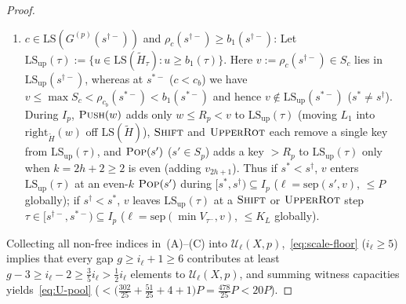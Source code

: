 \documentclass[11pt]{article}
\theoremstyle{definition}
\theoremstyle{remark}
\newcommand{\LS}{\mathrm{LS}}
\newcommand{\sep}{\mathrm{sep}}
\newcommand{\PUSH}{\textnormal{\scshape Push}}
\newcommand{\POP}{\textnormal{\scshape Pop}}
\newcommand{\SHIFT}{\textnormal{\scshape Shift}}
\newcommand{\UPROT}{\textnormal{\scshape UpperRot}}
\begin{document}
\begin{proof}
\begin{enumerate}[label=(\Alph*)]
\begin{itemize}[leftmargin=1.5em]
    \item \emph{Subcase B2 ($i_q = 2j$ even, with $q \ge 2$ or $v_{2j-1} > \rho_{c_a}(s^{\dagger -})$):} Here $v_{2j-1}$ lies above $\rho_{c_a}(s^{\dagger -})$ (hence $> \max S_{c_a}$), so $S_d := B_\ell(v_{2j-1})$ satisfies $c_a < d \le c_{\eta_q} < c_b$ ($d \notin \mathcal{F}_p$), while $v_{2j+1} > \max S_{c_{\eta_q}}$. If $d < c_{\eta_q}$, then $e_j = (v_{2j-1}, v_{2j}, v_{2j+1}) \in V_{X, p}$ would force $d \in \mathcal{F}_p$; hence $d = c_{\eta_q}$ ($v_{2j-1}, v_{2j} \in S_{c_{\eta_q}}$), pinning $\ell = \sep(s^\dagger, v_{2j-1}) < \sep(v_{2j-1}, v_{2j})$ and placing $e_j \in \mathcal{S}_1 \sqcup \mathcal{B}_{\mathrm{leaf,pre}}$ as in Lemma~\ref{lem:b3-escape}(d) (disjoint from $\mathcal{B}_{3,\mathrm{intra}}$, so each element of $\mathcal{B}_{3,\mathrm{intra}}$ is charged at most once in Class~A and once in Subcase~B1).
  \end{itemize}
  \item $c \in \LS(G^{(p)}(s^{\dagger -}))$ and $\rho_c(s^{\dagger -}) \ge b_1(s^{\dagger -})$: Let $\LS_{\mathrm{up}}(\tau) := \{u \in \LS(\widetilde{H}_\tau) : u \ge b_1(\tau)\}$. Here $v := \rho_c(s^{\dagger -}) \in S_c$ lies in $\LS_{\mathrm{up}}(s^{\dagger -})$, whereas at $s^{* -}$ ($c < c_b$) we have $v \le \max S_c < \rho_{c_b}(s^{* -}) < b_1(s^{* -})$ and hence $v \notin \LS_{\mathrm{up}}(s^{* -})$ ($s^* \ne s^\dagger$). During $I_p$, $\PUSH(w)$ adds only $w \le R_p < v$ to $\LS_{\mathrm{up}}(\tau)$ (moving $L_1$ into $\mathrm{right}_{\widetilde{H}}(w)$ off $\LS(\widetilde{H})$), $\SHIFT$ and $\UPROT$ each remove a single key from $\LS_{\mathrm{up}}(\tau)$, and $\POP(s')$ ($s' \in S_p$) adds a key $> R_p$ to $\LS_{\mathrm{up}}(\tau)$ only when $k = 2h + 2 \ge 2$ is even (adding $v_{2h+1}$). Thus if $s^* < s^\dagger$, $v$ enters $\LS_{\mathrm{up}}(\tau)$ at an even-$k$ $\POP(s')$ during $[s^*, s^\dagger) \subseteq I_p$ ($\ell = \sep(s', v)$, $\le P$ globally); if $s^\dagger < s^*$, $v$ leaves $\LS_{\mathrm{up}}(\tau)$ at a $\SHIFT$ or $\UPROT$ step $\tau \in [s^{\dagger -}, s^{* -}) \subseteq I_p$ ($\ell = \sep(\min V_{\tau^-}, v)$, $\le K_L$ globally).
\end{enumerate}
Collecting all non-free indices in~(A)--(C) into $\mathcal{U}_\ell(X, p)$,~\eqref{eq:scale-floor} ($i_\ell \ge 5$) implies that every gap $g \ge i_\ell + 1 \ge 6$ contributes at least $g - 3 \ge i_\ell - 2 \ge \frac{3}{5} i_\ell > \frac{1}{2} i_\ell$ elements to $\mathcal{U}_\ell(X, p)$, and summing witness capacities yields~\eqref{eq:U-pool} ($< \big(\frac{302}{25} + \frac{51}{25} + 4 + 1\big) P = \frac{478}{25} P < 20 P$).
\end{proof}
\end{document}

